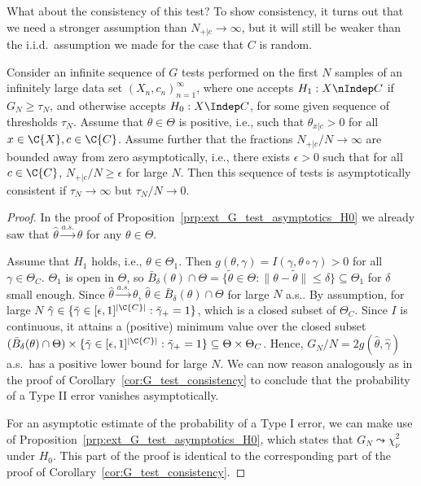 What about the consistency of this test? To show consistency, it turns out that we need a stronger assumption
than $N_{+|c} \to \infty$, but it will still be weaker than the i.i.d.\ assumption we made for the case that $C$ is random.
\begin{Cor}\label{cor:ext_G_test_consistency}
Consider an infinite sequence of $G$ tests performed on the first $N$ samples of an infinitely large
data set $(X_n,c_n)_{n=1}^\infty$,
where one accepts $H_1 : X \nIndep C$ if $G_N \ge \tau_N$, and otherwise accepts $H_0 : X \Indep C$, 
for some given sequence of thresholds $\tau_N$.
Assume that $\theta \in \Theta$ is positive, i.e., such that $\theta_{x|c} > 0$ for all $x \in \C{X}, c \in \C{C}$.
Assume further that the fractions $N_{+|c} / N \to \infty$ are bounded away from zero asymptotically,
i.e., there exists $\epsilon > 0$ such that for all $c \in \C{C}$, $N_{+|c} / N \ge \epsilon$ for large $N$.
Then this sequence of tests is asymptotically consistent if $\tau_N \to \infty$ but $\tau_N / N \to 0$.
\end{Cor}
\begin{proof}
In the proof of Proposition~\ref{prp:ext_G_test_asymptotics_H0}
we already saw that $\hat\theta \stackrel{a.s.}{\to} \theta$ for any $\theta \in \Theta$.

Assume that $H_1$ holds, i.e., $\theta \in \Theta_1$.
Then $g(\theta,\gamma) = I(\gamma, \theta \circ \gamma) > 0$ for all $\gamma \in \Theta_C$.
$\Theta_1$ is open in $\Theta$, so $\bar B_{\delta}(\theta) \cap \Theta = \{\tilde{\theta} \in \Theta : \lVert \theta - \tilde{\theta} \rVert \le \delta \} \subseteq \Theta_1$ for $\delta$ small enough.
Since $\hat\theta \stackrel{a.s.}{\to} \theta$, $\hat\theta \in \bar B_{\delta}(\theta) \cap \Theta$ for large $N$ a.s..
By assumption, for large $N$ $\hat\gamma \in \{\tilde{\gamma} \in [\epsilon,1]^{|\C{C}|} : \tilde{\gamma}_+ = 1\}$,
which is a closed subset of $\Theta_C$.
Since $I$ is continuous, it attains a (positive) minimum value over the closed subset
$(\bar B_{\delta}(\theta) \cap \Theta) \times \{\tilde{\gamma} \in [\epsilon,1]^{|\C{C}|} : \tilde{\gamma}_+ = 1\} \subseteq \Theta \times \Theta_C$.
Hence, $G_N / N = 2g(\hat\theta,\hat\gamma)$ a.s.\ has a positive lower bound for large $N$.
We can now reason analogously as in the proof of Corollary~\ref{cor:G_test_consistency} to conclude that
the probability of a Type II error vanishes asymptotically.

For an asymptotic estimate of the probability of a Type I error,
we can make use of Proposition~\ref{prp:ext_G_test_asymptotics_H0},
which states that $G_N \leadsto \chi_{\nu}^2$ under $H_0$. 
This part of the proof is identical to the corresponding part of the proof of Corollary~\ref{cor:G_test_consistency}.
\end{proof}
